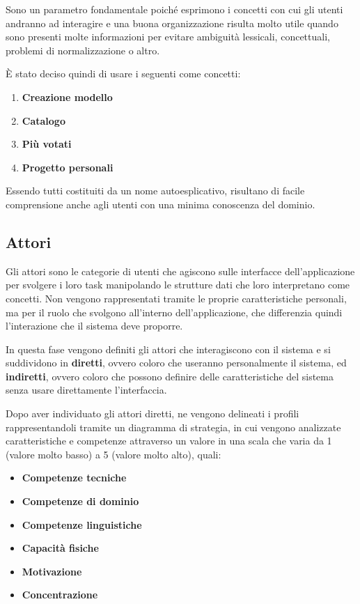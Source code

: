 \documentclass[12pt,italian,]{report}
\providecommand{\tightlist}{%
  \setlength{\itemsep}{0pt}\setlength{\parskip}{0pt}}
\begin{document}
Sono un parametro fondamentale poiché esprimono i concetti con cui gli
utenti andranno ad interagire e una buona organizzazione risulta molto
utile quando sono presenti molte informazioni per evitare ambiguità
lessicali, concettuali, problemi di normalizzazione o altro.

È stato deciso quindi di usare i seguenti come concetti:

\begin{enumerate}
\def\labelenumi{\arabic{enumi}.}
\tightlist
\item
  \textbf{Creazione modello}
\item
  \textbf{Catalogo}
\item
  \textbf{Più votati}
\item
  \textbf{Progetto personali}
\end{enumerate}

Essendo tutti costituiti da un nome autoesplicativo, risultano di facile comprensione anche agli utenti con una minima conoscenza del dominio.

\hypertarget{attori}{%
\subsection{Attori}\label{attori}}

Gli attori sono le categorie di utenti che agiscono sulle interfacce
dell'applicazione per svolgere i loro task manipolando le strutture dati
che loro interpretano come concetti. Non vengono rappresentati tramite
le proprie caratteristiche personali, ma per il ruolo che svolgono
all'interno dell'applicazione, che differenzia quindi l'interazione che
il sistema deve proporre.

In questa fase vengono definiti gli attori che interagiscono con il
sistema e si suddividono in \textbf{diretti}, ovvero coloro che
useranno personalmente il sistema, ed \textbf{indiretti}, ovvero coloro
che possono definire delle caratteristiche del sistema senza usare
direttamente l'interfaccia.

Dopo aver individuato gli attori diretti, ne vengono delineati i profili
rappresentandoli tramite un diagramma di strategia, in cui vengono
analizzate caratteristiche e competenze attraverso un valore in una
scala che varia da 1 (valore molto basso) a 5 (valore molto alto),
quali:

\begin{itemize}
\tightlist
\item
  \textbf{Competenze tecniche}
\item
  \textbf{Competenze di dominio}
\item
  \textbf{Competenze linguistiche}
\item
  \textbf{Capacità fisiche}
\item
  \textbf{Motivazione}
\item
  \textbf{Concentrazione}
\end{itemize}
\end{document}
